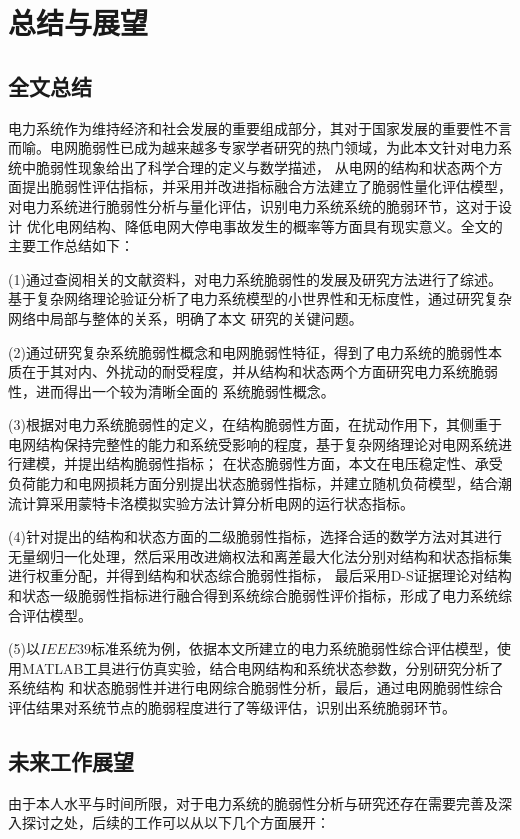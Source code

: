 \chapter{总结与展望}
\label{cha:summery}

\section{全文总结}
\label{sec:sum}
电力系统作为维持经济和社会发展的重要组成部分，其对于国家发展的重要性不言而喻。电网脆弱性已成为越来越多专家学者研究的热门领域，为此本文针对电力系统中脆弱性现象给出了科学合理的定义与数学描述，
从电网的结构和状态两个方面提出脆弱性评估指标，并采用并改进指标融合方法建立了脆弱性量化评估模型，对电力系统进行脆弱性分析与量化评估，识别电力系统系统的脆弱环节，这对于设计
优化电网结构、降低电网大停电事故发生的概率等方面具有现实意义。全文的主要工作总结如下：

(1)通过查阅相关的文献资料，对电力系统脆弱性的发展及研究方法进行了综述。基于复杂网络理论验证分析了电力系统模型的小世界性和无标度性，通过研究复杂网络中局部与整体的关系，明确了本文
研究的关键问题。

(2)通过研究复杂系统脆弱性概念和电网脆弱性特征，得到了电力系统的脆弱性本质在于其对内、外扰动的耐受程度，并从结构和状态两个方面研究电力系统脆弱性，进而得出一个较为清晰全面的
系统脆弱性概念。

(3)根据对电力系统脆弱性的定义，在结构脆弱性方面，在扰动作用下，其侧重于电网结构保持完整性的能力和系统受影响的程度，基于复杂网络理论对电网系统进行建模，并提出结构脆弱性指标；
在状态脆弱性方面，本文在电压稳定性、承受负荷能力和电网损耗方面分别提出状态脆弱性指标，并建立随机负荷模型，结合潮流计算采用蒙特卡洛模拟实验方法计算分析电网的运行状态指标。

(4)针对提出的结构和状态方面的二级脆弱性指标，选择合适的数学方法对其进行无量纲归一化处理，然后采用改进熵权法和离差最大化法分别对结构和状态指标集进行权重分配，并得到结构和状态综合脆弱性指标，
最后采用D-S证据理论对结构和状态一级脆弱性指标进行融合得到系统综合脆弱性评价指标，形成了电力系统综合评估模型。

(5)以$IEEE39$标准系统为例，依据本文所建立的电力系统脆弱性综合评估模型，使用MATLAB工具进行仿真实验，结合电网结构和系统状态参数，分别研究分析了系统结构
和状态脆弱性并进行电网综合脆弱性分析，最后，通过电网脆弱性综合评估结果对系统节点的脆弱程度进行了等级评估，识别出系统脆弱环节。

\section{未来工作展望}
\label{sec:feature}
由于本人水平与时间所限，对于电力系统的脆弱性分析与研究还存在需要完善及深入探讨之处，后续的工作可以从以下几个方面展开：

